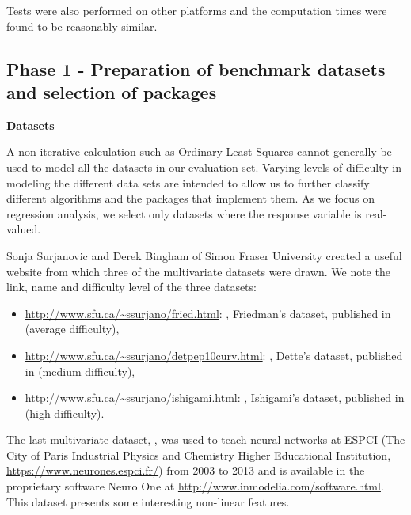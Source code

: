 Tests were also performed on other platforms and the computation times
were found to be reasonably similar.

\hypertarget{phase-1---preparation-of-benchmark-datasets-and-selection-of-packages}{%
\subsection{Phase 1 - Preparation of benchmark datasets and selection of
packages}\label{phase-1---preparation-of-benchmark-datasets-and-selection-of-packages}}

\textbf{Datasets}

A non-iterative calculation such as Ordinary Least Squares cannot
generally be used to model all the datasets in our evaluation set.
Varying levels of difficulty in modeling the different data sets are
intended to allow us to further classify different algorithms and the
packages that implement them. As we focus on regression analysis, we
select only datasets where the response variable is real-valued.

Sonja Surjanovic and Derek Bingham of Simon Fraser University created a
useful website from which three of the multivariate datasets were drawn.
We note the link, name and difficulty level of the three datasets:

\begin{itemize}
\tightlist
\item
  \url{http://www.sfu.ca/~ssurjano/fried.html}: ,
  Friedman's dataset, published in \citep{friedman91} (average
  difficulty),\\
\item
  \url{http://www.sfu.ca/~ssurjano/detpep10curv.html}: ,
  Dette's dataset, published in \citep{dettePepelyshev10} (medium
  difficulty),\\
\item
  \url{http://www.sfu.ca/~ssurjano/ishigami.html}: ,
  Ishigami's dataset, published in \citep{ishigamietal90} (high
  difficulty).
\end{itemize}

The last multivariate dataset, , was used to teach neural
networks at ESPCI (The City of Paris Industrial Physics and Chemistry
Higher Educational Institution, \url{https://www.neurones.espci.fr/})
from 2003 to 2013 and is available in the proprietary software Neuro One
at \url{http://www.inmodelia.com/software.html}. This dataset presents
some interesting non-linear features.

